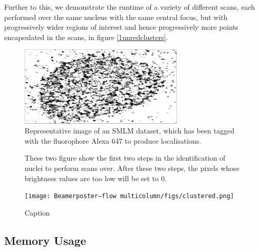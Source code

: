 \documentclass[11pt]{article}
\begin{document}
Further to this, we demonstrate the runtime of a variety of different scans, each performed over the same nucleus with the same central focus, but with progressively wider regions of interest and hence progressively more points encapsulated in the scans, in figure \ref{1unredclusters}. 

\begin{figure}
\centering
\includegraphics[width=0.7\textwidth]{figs/87_32_standard_region.png}
\caption{Representative image of an SMLM dataset, which has been tagged with the fluorophore Alexa 647 to produce localisations.}
\label{standardregion}
\end{figure}

\begin{figure}[h!]
	\centering
	\qquad
	\caption{These two figure show the first two steps in the identification of nuclei to perform scans over. After these two steps, the pixels whose brightness values are too low will be set to 0.}%
	\label{blurprocess}
\end{figure}

\begin{figure}[h!]
    \centering
    \texttt{[image: Beamerposter—flow multicolumn/figs/clustered.png]}
    \caption{Caption}
    \label{After the pixel values in figure \ref{blurprocess} have been thresholded, the \textit{islands} within the image can be identified, and constitute the regions of interest to perform a scan over. }
\end{figure}


\subsection{Memory Usage} \label{chapter:memusage}
\end{document}
